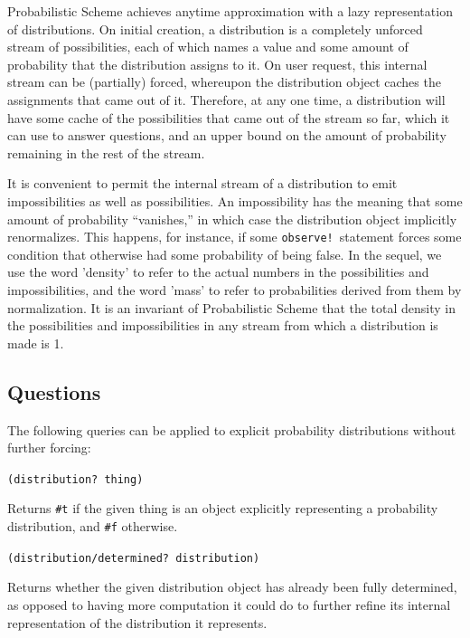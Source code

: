 \documentclass[10pt]{sigplanconf}
\newcommand{\code}[1]{\texttt{#1}}
\newenvironment{documentation}[1]{\vspace{5pt} \noindent \texttt{#1} \nopagebreak \begin{list}{}{\leftmargin 0.7cm}\item}{\end{list}}
\begin{document}
Probabilistic Scheme achieves anytime approximation with a lazy
representation of distributions.  On initial creation, a distribution
is a completely unforced stream of possibilities, each of which names
a value and some amount of probability that the distribution assigns
to it.  On user request, this internal stream can be (partially)
forced, whereupon the distribution object caches the assignments that
came out of it.  Therefore, at any one time, a distribution will have
some cache of the possibilities that came out of the stream so far,
which it can use to answer questions, and an upper bound on the amount
of probability remaining in the rest of the stream.

It is convenient to permit the internal stream of a distribution
to emit impossibilities as well as possibilities.  An impossibility
has the meaning that some amount of probability ``vanishes,'' in
which case the distribution object implicitly renormalizes.  This
happens, for instance, if some \code{observe!}\ statement forces some condition
that otherwise had some probability of being false.
In the sequel, we use the word 'density' to refer to the actual
numbers in the possibilities and impossibilities, and the word 'mass'
to refer to probabilities derived from them by normalization.
It is an invariant of Probabilistic Scheme that
the total density in the possibilities and impossibilities in
any stream from which a distribution is made is 1.

\subsection{Questions}

The following queries can be applied to explicit probability
distributions without further forcing:

\begin{documentation}{(distribution?\ thing)}
Returns \code{\#t} if the given thing is an object explicitly
representing a probability distribution, and \code{\#f} otherwise.
\end{documentation}

\begin{documentation}{(distribution/determined?\ distribution)}
Returns whether the given distribution object has already been fully
determined, as opposed to having more computation it could do to
further refine its internal representation of the distribution it
represents.
\end{documentation}
\end{document}
